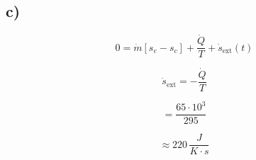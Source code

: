 

\subsection*{c)}

\[
0 = \dot{m} \left[ s_e - s_c \right] + \frac{\dot{Q}}{T} + \dot{s}_{\text{ext}}(t)
\]

\[
\dot{s}_{\text{ext}} = -\frac{\dot{Q}}{T}
\]

\[
= \frac{65 \cdot 10^3}{295}
\]

\[
\approx 220 \, \frac{J}{K \cdot s}
\]
